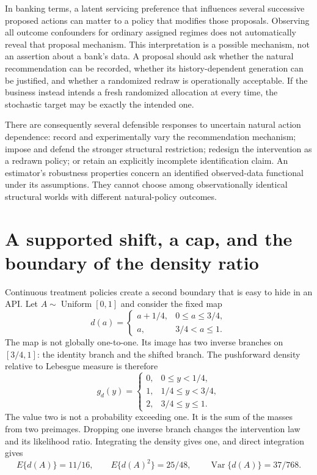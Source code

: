 In banking terms, a latent servicing preference that influences several
successive proposed actions can matter to a policy that modifies those
proposals. Observing all outcome confounders for ordinary assigned regimes
does not automatically reveal that proposal mechanism. This interpretation
is a possible mechanism, not an assertion about a bank's data. A proposal
should ask whether the natural recommendation can be recorded, whether its
history-dependent generation can be justified, and whether a randomized
redraw is operationally acceptable. If the business instead intends a fresh
randomized allocation at every time, the stochastic target may be exactly
the intended one.

There are consequently several defensible responses to uncertain natural
action dependence: record and experimentally vary the recommendation
mechanism; impose and defend the stronger structural restriction; redesign
the intervention as a redrawn policy; or retain an explicitly incomplete
identification claim. An estimator's robustness properties concern an
identified observed-data functional under its assumptions. They cannot
choose among observationally identical structural worlds with different
natural-policy outcomes.

\section{A supported shift, a cap, and the boundary of the density ratio}
\label{exec17:s5-pushforward}

Continuous treatment policies create a second boundary that is easy to hide in
an API. Let $A\sim\operatorname{Uniform}[0,1]$ and consider the fixed map
\begin{equation}
 d(a)=\begin{cases}a+1/4,&0\leq a\leq3/4,\\a,&3/4<a\leq1.\end{cases}
 \label{exec17:s5-shift}
\end{equation}
The map is not globally one-to-one. Its image has two inverse branches on
$[3/4,1]$: the identity branch and the shifted branch. The pushforward density
relative to Lebesgue measure is therefore
\begin{equation}
 g_d(y)=\begin{cases}
 0,&0\leq y<1/4,\\
 1,&1/4\leq y<3/4,\\
 2,&3/4\leq y\leq1.
 \end{cases}
 \label{exec17:s5-push-density}
\end{equation}
The value two is not a probability exceeding one. It is the sum of the masses
from two preimages. Dropping one inverse branch changes the intervention law
and its likelihood ratio. Integrating the density gives one, and direct
integration gives
\begin{equation}
 E\{d(A)\}=11/16,\qquad E\{d(A)^2\}=25/48,\qquad
 \operatorname{Var}\{d(A)\}=37/768.
 \label{exec17:s5-push-moments}
\end{equation}

